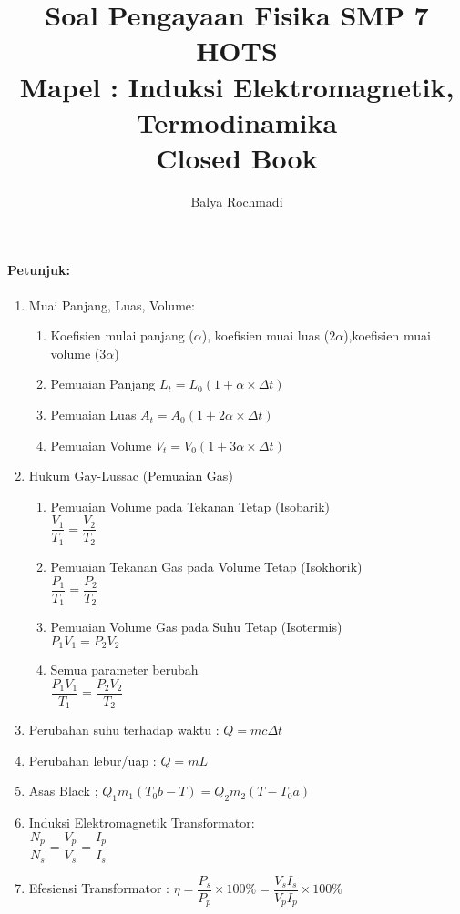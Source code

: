\documentclass[12pt,a4paper,draft,final,oneside,twoside,openright,openany]{article}
\author{Balya Rochmadi}
\title{Soal Pengayaan Fisika SMP 7 HOTS\\Mapel : Induksi Elektromagnetik, Termodinamika \\Closed Book}
\begin{document}
	\maketitle
	\Large
		\noindent\makebox[\linewidth]{\rule{\paperwidth}{0.4pt}}
		
		\paragraph{Petunjuk: }
		\begin{enumerate}
			\item Muai Panjang, Luas, Volume:
					\begin{enumerate}
						\item  Koefisien mulai panjang ($\alpha$), koefisien muai luas ($2\alpha$),koefisien muai volume ($3\alpha$)
						\item Pemuaian Panjang $L_t=L_0(1+\alpha\times\Delta t)$
						\item Pemuaian Luas $A_t=A_0(1+2\alpha\times\Delta t)$
						\item Pemuaian Volume $V_t=V_0(1+3\alpha\times\Delta t)$
					\end{enumerate}
			\item Hukum Gay-Lussac (Pemuaian Gas)
					\begin{enumerate}
						\item Pemuaian Volume pada Tekanan Tetap (Isobarik) \\
						$\dfrac{V_1}{T_1}=\dfrac{V_2}{T_2}$
						\item  Pemuaian Tekanan Gas pada Volume Tetap (Isokhorik)\\
						$\dfrac{P_1}{T_1}=\dfrac{P_2}{T_2}$
						\item Pemuaian Volume Gas pada Suhu Tetap (Isotermis)\\
						$P_1V_1=P_2V_2$
						\item Semua parameter berubah\\
						$\dfrac{P_1V_1}{T_1}=\dfrac{P_2V_2}{T_2}$
					\end{enumerate}
			\item Perubahan suhu terhadap waktu : $Q=mc\Delta t$
			\item Perubahan lebur/uap			: $Q=mL$
			\item Asas Black ;	$Q_1m_1(T_0b-T)=Q_2m_2(T-T_0a) $
			\item Induksi Elektromagnetik Transformator:\\
				$\dfrac{N_p}{N_s}=\dfrac{V_p}{V_s}=\dfrac{I_p}{I_s} $
			\item Efesiensi Transformator : $\eta=\dfrac{P_s}{P_p}\times 100\%=\dfrac{V_sI_s}{V_pI_p}\times 100\%$
		\end{enumerate}
\end{document}

